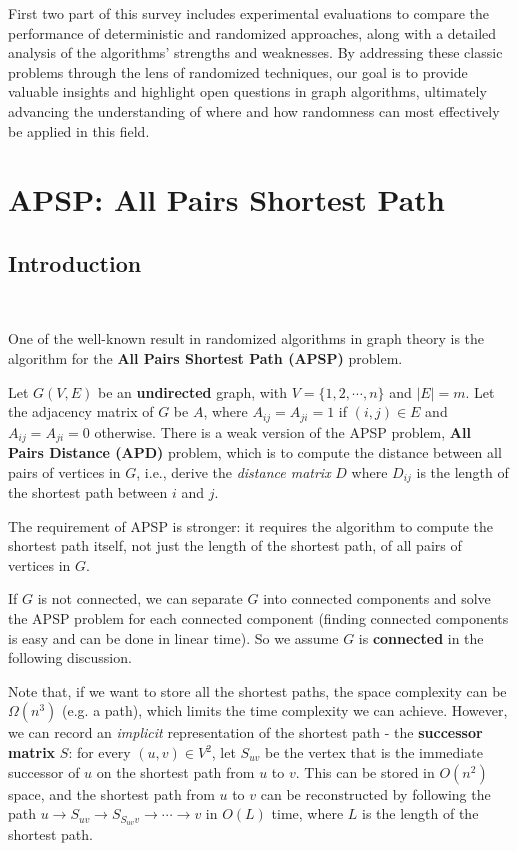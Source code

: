 \documentclass[11pt]{article}
\theoremstyle{plain}
\begin{document}
First two part of this survey includes experimental evaluations to compare the performance of deterministic and randomized approaches, along with a detailed analysis of the algorithms' strengths and weaknesses. By addressing these classic problems through the lens of randomized techniques, our goal is to provide valuable insights and highlight open questions in graph algorithms, ultimately advancing the understanding of where and how randomness can most effectively be applied in this field.

\section{APSP: All Pairs Shortest Path}
\subsection{Introduction}\

One of the well-known result in randomized algorithms in graph theory is the algorithm for the \textbf{All Pairs Shortest Path (APSP)} problem.

Let $G(V,E)$ be an \textbf{undirected} graph, with $V=\{1,2,\cdots,n\}$ and $|E|=m$. Let the adjacency matrix of $G$ be $A$, where $A_{ij}=A_{ji}=1$ if $(i,j)\in E$ and $A_{ij}=A_{ji}=0$ otherwise. There is a weak version of the APSP problem, \textbf{All Pairs Distance (APD)} problem, which is to compute the distance between all pairs of vertices in $G$, i.e., derive the \emph{distance matrix} $D$ where $D_{ij}$ is the length of the shortest path between $i$ and $j$.

The requirement of APSP is stronger: it requires the algorithm to compute the shortest path itself, not just the length of the shortest path, of all pairs of vertices in $G$. 

If $G$ is not connected, we can separate $G$ into connected components and solve the APSP problem for each connected component (finding connected components is easy and can be done in linear time). So we assume $G$ is \textbf{connected} in the following discussion.

Note that, if we want to store all the shortest paths, the space complexity can be $\Omega(n^3)$ (e.g. a path), which limits the time complexity we can achieve. However, we can record an \emph{implicit} representation of the shortest path - the \textbf{successor matrix} $S$: for every $(u,v)\in V^2$, let $S_{uv}$ be the vertex that is the immediate successor of $u$ on the shortest path from $u$ to $v$. This can be stored in $O(n^2)$ space, and the shortest path from $u$ to $v$ can be reconstructed by following the path $u\to S_{uv}\to S_{S_{uv}v}\to\cdots\to v$ in $O(L)$ time, where $L$ is the length of the shortest path.
\end{document}

